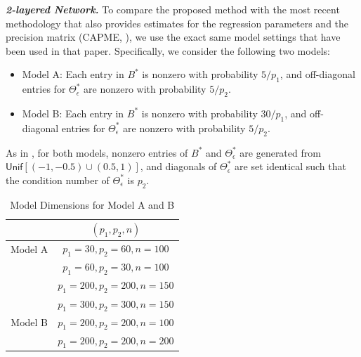 \textbf{\textit{2-layered Network.}} To compare the proposed method with the most recent methodology that also provides estimates for the regression parameters and the precision matrix (CAPME, \cite{cai2012covariate}), we use the exact same model settings that have been used in that paper. Specifically, we consider the following two models: 
\begin{itemize}
\item Model A: Each entry in $B^*$ is nonzero with probability $5/p_1$, and off-diagonal entries for $\Theta_\epsilon^*$ are nonzero with probability $5/p_2$. 
\item Model B: Each entry in $B^*$ is nonzero with probability $30/p_1$, and off-diagonal entries for $\Theta_\epsilon^*$ are nonzero with probability $5/p_2$. 
\end{itemize}
As in \citet{cai2012covariate}, for both models, nonzero entries of $B^*$ and $\Theta_\epsilon^*$ are generated from $\mathsf{Unif}\left[(-1,-0.5)\cup(0.5,1)\right]$, and diagonals of $\Theta_\epsilon^*$ are set identical such that the condition number of $\Theta_\epsilon^*$ is $p_2$. 
\begin{table}[H]
\centering
\caption{Model Dimensions for Model A and B}
\begin{tabular}{cc}
\hline
    	& $(p_1,p_2,n)$ \\ \hline
Model A	 & $p_1=30, p_2=60, n=100$ \\
																		& $p_1=60, p_2=30, n=100$ \\
																		& $p_1=200, p_2=200, n=150$ \\														& $p_1=300, p_2=300, n=150$ \\ 
\hline
Model B& $p_1=200,p_2=200,n=100$ \\
																		& $p_1= 200, p_2=200, n=200$ \\
\hline
\end{tabular}
\end{table}

